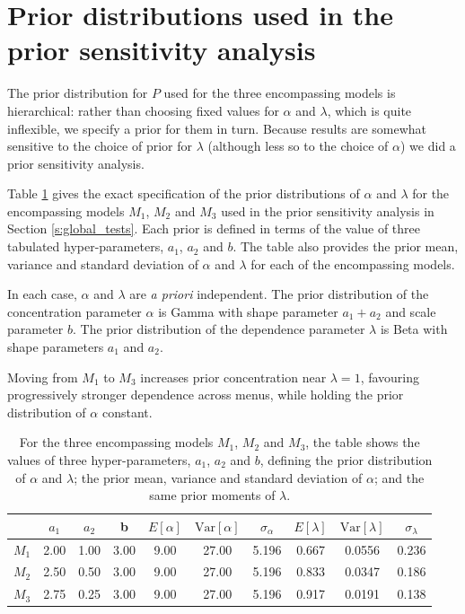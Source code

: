 \documentclass[11pt,letter]{article}
\newcommand{\menus}{menus}
\begin{document}
\section{Prior distributions used in the prior sensitivity analysis}\label{s:prior}

The prior distribution for $P$ used for the three encompassing models is hierarchical: rather than choosing fixed values for $\alpha$ and $\lambda$, which is quite inflexible, we specify a prior for them in turn.
Because results are somewhat sensitive to the choice of prior for $\lambda$ (although less so to the choice of $\alpha$) we did a prior sensitivity analysis.

Table \ref{t:hyper} gives the exact specification of the prior distributions of $\alpha$ and $\lambda$ for the encompassing models $M_1$, $M_2$ and $M_3$ used in the prior sensitivity analysis in Section \ref{s:global_tests}.
Each prior is defined in terms of the value of three tabulated hyper-parameters, $a_1$, $a_2$ and $b$.
The table also provides the prior mean, variance and standard deviation of $\alpha$ and $\lambda$ for each of the encompassing models.

In each case, $\alpha$ and $\lambda$ are {\em a priori} independent.
The prior distribution of the concentration parameter $\alpha$ is Gamma with shape parameter $a_1 + a_2$ and scale parameter $b$.
The prior distribution of the dependence parameter $\lambda$ is Beta with shape parameters $a_1$ and $a_2$.

Moving from $M_1$ to $M_3$ increases prior concentration near $\lambda = 1$, favouring progressively stronger dependence across \menus{}, while holding the prior distribution of $\alpha$ constant.

\begin{table}
  \centering
  \begin{tabular}{cccccccccc}
    & $a_1$ & $a_2$ & b &
    $E[\alpha]$ & $\mathrm{Var}[\alpha]$ & $\sigma_\alpha$ & $E[\lambda]$ & $\mathrm{Var}[\lambda]$ & $\sigma_\lambda$ \\
    \hline
    $M_1$ & 2.00 & 1.00 & 3.00 & 9.00 & 27.00 & 5.196 & 0.667 & 0.0556 & 0.236 \\
    $M_2$ & 2.50 & 0.50 & 3.00 & 9.00 & 27.00 & 5.196 & 0.833 & 0.0347 & 0.186 \\
    $M_3$ & 2.75 & 0.25 & 3.00 & 9.00 & 27.00 & 5.196 & 0.917 & 0.0191 & 0.138 \\
    \hline
  \end{tabular}\caption{For the three encompassing models $M_1$, $M_2$ and $M_3$, the table shows the values of three hyper-parameters, $a_1$, $a_2$ and $b$, defining the prior distribution of $\alpha$ and $\lambda$; the prior mean, variance and standard deviation of $\alpha$; and the same prior moments of $\lambda$.}\label{t:hyper}
\end{table}
\end{document}
